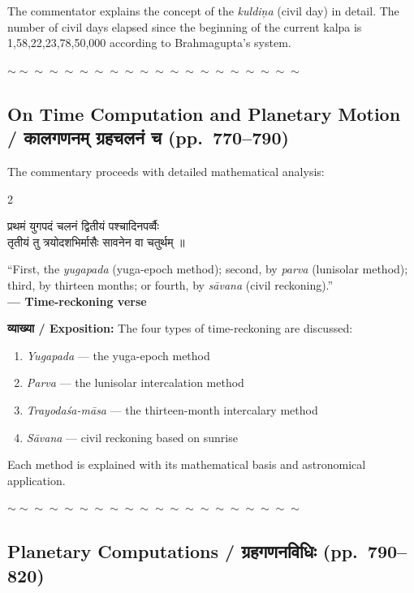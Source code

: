 \documentclass[11pt,a4paper]{article}
\newcommand{\dev}[1]{{\devanagarifont #1}}
\newenvironment{bilingualverse}{%
  \begin{paracol}{2}
  \fontsize{10.5}{13}\selectfont
}{%
  \end{paracol}
  \vspace{0.3cm}
}
\newcommand{\wavydivider}{\begin{center}$\sim\sim\sim\sim\sim\sim\sim\sim\sim\sim\sim\sim\sim\sim\sim\sim\sim\sim\sim\sim$\end{center}}
\begin{document}
\vspace{0.3cm}
The commentator explains the concept of the \textit{kuldiņa} (civil day) in detail. The number of civil days elapsed since the beginning of the current kalpa is 1,58,22,23,78,50,000 according to Brahmagupta's system.

\wavydivider

\subsection*{On Time Computation and Planetary Motion / \dev{कालगणनम् ग्रहचलनं च} (pp.\ 770--790)}

The commentary proceeds with detailed mathematical analysis:

\begin{bilingualverse}
\begin{leftcolumn*}
\dev{प्रथमं युगपदं चलनं द्वितीयं पश्चादिनपर्व्वैः}\\
\dev{तृतीयं तु त्रयोदशभिर्मासैः सावनेन वा चतुर्थम् ॥}
\end{leftcolumn*}
\begin{rightcolumn}
``First, the \textit{yugapada} (yuga-epoch method); second, by \textit{parva} (lunisolar method); third, by thirteen months; or fourth, by \textit{sāvana} (civil reckoning).''\\[0.3cm]
\hfill\textbf{— Time-reckoning verse}
\end{rightcolumn}
\end{bilingualverse}

\textbf{\dev{व्याख्या} / Exposition:} The four types of time-reckoning are discussed:
\begin{enumerate}[label=(\roman*),leftmargin=2em]
  \item \textit{Yugapada} --- the yuga-epoch method
  \item \textit{Parva} --- the lunisolar intercalation method
  \item \textit{Trayodaśa-māsa} --- the thirteen-month intercalary method
  \item \textit{Sāvana} --- civil reckoning based on sunrise
\end{enumerate}
Each method is explained with its mathematical basis and astronomical application.

\wavydivider

\subsection*{Planetary Computations / \dev{ग्रहगणनविधिः} (pp.\ 790--820)}
\end{document}
